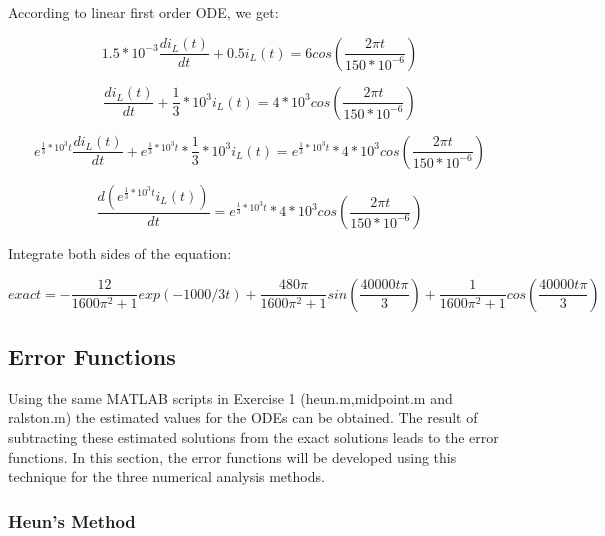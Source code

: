 \documentclass[11pt,a4paper]{article}
\begin{document}
According to linear first order ODE, we get:

\begin{equation}
1.5*10^{-3}\frac{di_L(t)}{dt}+0.5i_L(t)=6cos(\frac{2{\pi}t}{150*{10^{-6}}})
\end{equation}

\begin{equation}
\frac{di_L(t)}{dt}+\frac{1}{3}*10^3i_L(t)=4*10^3cos(\frac{2{\pi}t}{150*{10^{-6}}})
\end{equation}

\begin{equation}
e^{{\frac{1}{3}*10^3}t}\frac{di_L(t)}{dt}+e^{{\frac{1}{3}*10^3}t}*\frac{1}{3}*10^3i_L(t)=e^{{\frac{1}{3}*10^3}t}*4*10^3cos(\frac{2{\pi}t}{150*{10^{-6}}})
\end{equation}

\begin{equation}
\frac{d(e^{{\frac{1}{3}*10^3}t}i_L(t))}{dt}=e^{{\frac{1}{3}*10^3}t}*4*10^3cos(\frac{2{\pi}t}{150*{10^{-6}}})
\end{equation}

Integrate both sides of the equation:

\begin{equation}
exact=-\frac{12}{1600\pi^2+1}exp(-1000/3t)+\frac{480\pi}{1600\pi^2+1}sin(\frac{40000t\pi}{3})+\frac{1}{1600\pi^2+1}cos(\frac{40000t\pi}{3})
\end{equation}

\subsection{Error Functions}
Using the same MATLAB scripts in Exercise 1 (heun.m,midpoint.m and ralston.m) the estimated values for the ODEs can be obtained. The result of subtracting these estimated solutions from the exact solutions leads to the error functions. In this section, the error functions will be developed using this technique for the three numerical analysis methods.

\subsubsection{Heun's Method}
\end{document}
